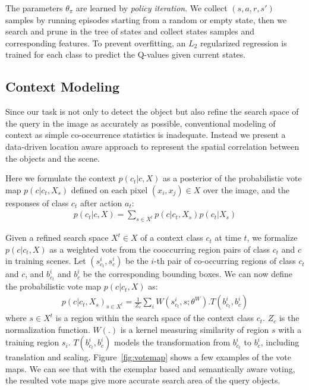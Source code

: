 The parameters $\theta_\pi$ are learned by \textit{policy iteration}. We collect $(s,a,r,s')$ samples by running episodes starting from a random or empty state, then we search and prune in the tree of states and collect states samples  and corresponding features. To prevent overfitting, an $L_2$ regularized regression is trained for each class to predict the Q-values given current states.

\subsection{Context Modeling}
\label{sec:context}
Since our task is not only to detect the object but also refine the search space of the query in the image as accurately as possible, conventional modeling of context as simple co-occurrence statistics is inadequate. Instead we present a data-driven location aware approach to represent the spatial correlation between the objects and the scene. 

Here we formulate the context $p(c_t|c,X)$ as a posterior of the probabilistic vote map $p(c|c_t,X_s)$ defined on each pixel $(x_i,x_j)\in X$ over the image, and the responses of class $c_t$ after action $a_t$:
\begin{eqnarray}
p(c_t|c,X) = \sum_{s\in X^t} p(c|c_t,X_s)p(c_t|X_s)
\end{eqnarray}

Given a refined search space $X^t\in X$ of a context class $c_t$ at time $t$, we formalize $p(c|c_t,X)$ as a weighted vote from the cooccurring region pairs of class $c_t$ and $c$ in training scenes. Let $(s_{c_t}^i, s_c^i)$ be the $i$-th pair of co-occurring regions of class $c_t$ and $c$, and $b_{c_t}^i$ and $b_c^i$ be the corresponding bounding boxes. We can now define the probabilistic vote map $p(c|c_t,X)$ as:
\begin{eqnarray}
\label{eq:votemap}
p(c|c_t,X_s)_{s\in X^t} = \frac{1}{Z_c}\sum_i W(s_{c_t}^i,s;\theta^W).T(b_{c_t}^i,b_c^i)
\end{eqnarray}
where $s\in X^t$ is a region within the search space of the context class $c_t$. $Z_c$ is the normalization function. $W(.)$ is a kernel measuring similarity of region $s$ with a training region $s_i$. $T(b_{c_t}^i,b_c^i)$ models the transformation from $b_{c_t}^i$ to $b_c^i$, including translation and scaling. Figure~\ref{fig:votemap} shows a few examples of the vote maps. We can see that with the exemplar based and semantically aware voting, the resulted vote maps give more accurate search area of the query objects.


